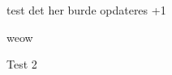 \documentclass{article}
\begin{document}
test
det her burde opdateres
+1

weow

Test 2
\end{document}
